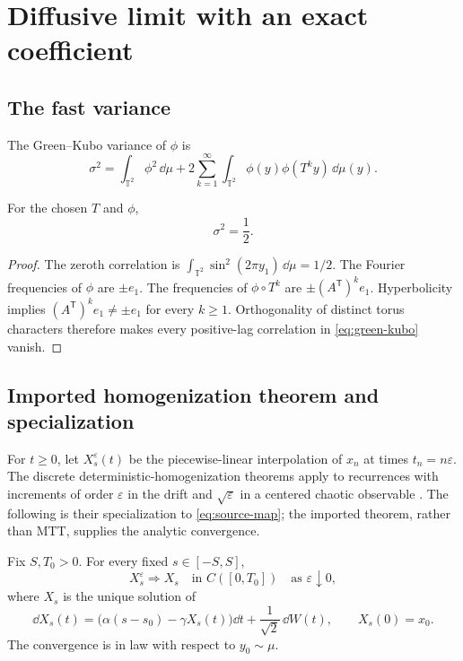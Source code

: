 \documentclass[11pt]{article}
\newcommand{\T}{\mathbb{T}}
\begin{document}
\section{Diffusive limit with an exact coefficient}

\subsection{The fast variance}

The Green--Kubo variance of \(\phi\) is
\begin{equation}
\sigma^2
=
\int_{\T^2}\phi^2\,\dd\mu
+2\sum_{k=1}^{\infty}
\int_{\T^2}\phi(y)\phi(T^k y)\,\dd\mu(y).
\label{eq:green-kubo}
\end{equation}

\begin{lemma}
\label{lem:variance}
For the chosen \(T\) and \(\phi\),
\[
\sigma^2=\frac12.
\]
\end{lemma}

\begin{proof}
The zeroth correlation is
\(
\int_{\T^2}\sin^2(2\pi y_1)\,\dd\mu=1/2
\).
The Fourier frequencies of \(\phi\) are \(\pm e_1\). The frequencies of
\(\phi\circ T^k\) are
\(\pm(A^{\mathsf T})^k e_1\). Hyperbolicity implies
\((A^{\mathsf T})^k e_1\ne\pm e_1\) for every \(k\ge1\).
Orthogonality of distinct torus characters therefore makes every positive-lag correlation in \eqref{eq:green-kubo} vanish.
\end{proof}

\subsection{Imported homogenization theorem and specialization}

For \(t\ge0\), let \(X^\varepsilon_s(t)\) be the piecewise-linear interpolation of
\(x_n\) at times \(t_n=n\varepsilon\). The discrete deterministic-homogenization theorems apply to recurrences with increments of order \(\varepsilon\) in the drift and \(\sqrt{\varepsilon}\) in a centered chaotic observable \cite{GottwaldMelbourne2013,ChevyrevEtAl2022}. The following is their specialization to \eqref{eq:source-map}; the imported theorem, rather than MTT, supplies the analytic convergence.

\begin{theorem}
\label{thm:homogenization}
Fix \(S,T_0>0\). For every fixed \(s\in[-S,S]\),
\[
X^\varepsilon_s\Longrightarrow X_s
\quad\text{in }C([0,T_0])
\quad\text{as }\varepsilon\downarrow0,
\]
where \(X_s\) is the unique solution of
\begin{equation}
\dd X_s(t)
=
\bigl(\alpha(s-s_0)-\gamma X_s(t)\bigr)\dd t
+\frac{1}{\sqrt2}\,\dd W(t),
\qquad
X_s(0)=x_0.
\label{eq:ou-limit}
\end{equation}
The convergence is in law with respect to \(y_0\sim\mu\).
\end{theorem}
\end{document}
